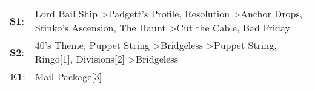 \begin{supertabular}{p{0.03\textwidth}p{0.92\textwidth}}
 \textbf{S1}:  &  Lord Bail Ship\textsuperscript{} \textgreater \enspace Padgett's Profile\textsuperscript{}, \enspace Resolution\textsuperscript{} \textgreater \enspace Anchor Drops\textsuperscript{}, \enspace Stinko's Ascension\textsuperscript{}, \enspace The Haunt\textsuperscript{} \textgreater \enspace Cut the Cable\textsuperscript{}, \enspace Bad Friday\textsuperscript{}  \enspace  \\
 \textbf{S2}:  &                                                          40's Theme\textsuperscript{}, \enspace Puppet String\textsuperscript{} \textgreater \enspace Bridgeless\textsuperscript{} \textgreater \enspace Puppet String\textsuperscript{}, \enspace Ringo[1]\textsuperscript{}, \enspace Divisions[2]\textsuperscript{} \textgreater \enspace Bridgeless\textsuperscript{}  \enspace  \\
 \textbf{E1}:  &                                                                                                                                                                                                                                                                                                                                         Mail Package[3]\textsuperscript{}  \enspace  \\
\end{supertabular}
